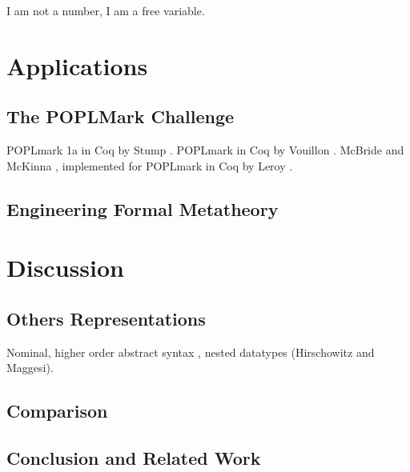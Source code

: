 \documentclass[a4paper,11pt]{article}
\begin{document}
I am not a number, I am a free variable.


\section{Applications}

\subsection{The POPLMark Challenge}

POPLmark 1a in Coq by Stump \cite{Stump-05}.
POPLmark in Coq by Vouillon \cite{Vouillon-05}.
McBride and McKinna \cite{McBride-McKinna-04}, implemented for POPLmark in Coq by Leroy \cite{Leroy-07}.

\subsection{Engineering Formal Metatheory}


\section{Discussion}\label{sec:discussion}

\subsection{Others Representations}

Nominal, higher order abstract syntax \cite{Capretta-Felty-06}, nested datatypes (Hirschowitz and Maggesi).

\subsection{Comparison}

\subsection{Conclusion and Related Work}


\nocite{*}


\end{document}
